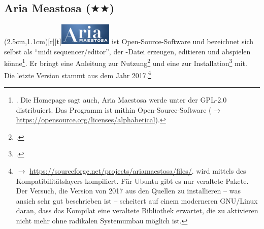 %
%
%



\subsection{Aria Meastosa ($\bigstar$$\bigstar$)}

\parpic(2.5cm,1.1cm)[r][t]{\includegraphics[width=2.5cm]{logos/ariamaestoso-300dpi.png}}
\label{AriaMaestosa} ist Open-Source-Software und bezeichnet
sich selbst als  \enquote{midi sequencer/editor}, der -Datei erzeugen,
editieren und abspielen könne\footnote{\cite[vgl.][\nopage
wp]{AriaMaestosa2017a}. Die Homepage sagt auch, Aria Maestosa werde unter der
GPL-2.0 distribuiert. Das Programm ist mithin Open-Source-Software ($\rightarrow$
\href{https://opensource.org/licenses/alphabetical}
{https://opensource.org/licenses/alphabetical}).}. Er bringt eine Anleitung zur
Nutzung\footcite[vgl.][\nopage wp]{AriaMaestosa2017b} und eine zur
Installation\footcite[vgl.][\nopage wp]{AriaMaestosa2017c} mit. Die letzte
Version stammt aus dem Jahr 2017.\footnote{$\rightarrow$
\href{https://sourceforge.net/projects/ariamaestosa/files/}
{https://sourceforge.net/projects/ariamaestosa/files/}.  wird
mittels des Kompatibilitätslayers  kompiliert. Für Ubuntu gibt es
nur veraltete Pakete. Der Versuch, die Version von 2017 aus den Quellen zu
installieren -- was ansich sehr gut beschrieben ist -- scheitert auf einem
mo\-der\-ne\-ren GNU/Linux daran, dass das Kompilat eine veraltete Bibliothek
erwartet, die zu aktivieren nicht mehr ohne radikalen Systemumbau möglich ist.}

